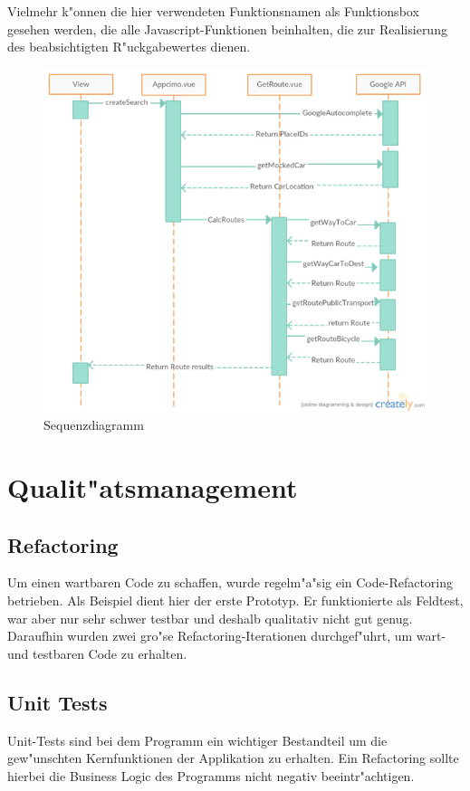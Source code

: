 \documentclass[a4paper, 11pt]{scrreprt}
\begin{document}
Vielmehr k"onnen die hier verwendeten Funktionsnamen als Funktionsbox gesehen werden, die alle Javascript-Funktionen beinhalten, die zur Realisierung des beabsichtigten R"uckgabewertes dienen.

\begin{figure} [H]
\begin{center}
\includegraphics[scale=1]{sequenzdiagramm.png}
\caption{Sequenzdiagramm}
\label{Sequenzdiagramm}
\end{center}
\end{figure}

\section{Qualit"atsmanagement}

\subsection{Refactoring}
Um einen wartbaren Code zu schaffen, wurde regelm"a"sig ein Code-Refactoring betrieben. 
Als Beispiel dient hier der erste Prototyp. Er funktionierte als Feldtest, war aber nur sehr schwer testbar und deshalb qualitativ nicht gut genug. Daraufhin wurden zwei gro"se Refactoring-Iterationen durchgef"uhrt, um wart- und testbaren Code zu erhalten.


\subsection{Unit Tests}
Unit-Tests sind bei dem Programm ein wichtiger Bestandteil um die gew"unschten Kernfunktionen der Applikation zu erhalten. Ein Refactoring sollte hierbei die Business Logic des Programms nicht negativ beeintr"achtigen.\\
\end{document}
